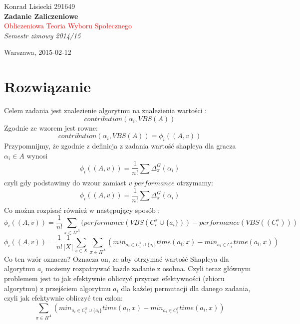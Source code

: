 \documentclass[oneside]{book}
\newcommand*{\titleTH}{\begingroup %
\raggedleft %
\vspace*{\baselineskip} %

{\Large Konrad Lisiecki 291649}\\[0.167\textheight] %

{\LARGE\bfseries Zadanie Zaliczeniowe}\\[\baselineskip] %

{\textcolor{Red}{\Huge Obliczeniowa Teoria Wyboru Społecznego}}\\[\baselineskip] %

{\Large \textit{Semestr zimowy  2014/15  }}\par %

\vfill %

{\large  Warszawa, 2015-02-12}\par %
\renewcommand{\chaptername}{Podpunkt}

\vspace*{3\baselineskip} %
\endgroup}
\begin{document}
 

\pagestyle{empty} %
	

\titleTH %

 


\chapter*{Rozwiązanie}
 
Celem zadania jest znalezienie algorytmu na znalezienia wartości 	:
\begin{equation}
contribution(\alpha_i, VBS(A))
\end{equation}
Zgodnie ze wzorem jest rowne:
\begin{equation}
contribution(\alpha_i, VBS(A)) =  \phi_i((A,v))
\end{equation}
Przypomnijmy, że zgodnie
 z definicja z zadania
 wartość shapleya 
 dla gracza $\alpha_i \in A$ wynosi 
 \begin{equation}
 \phi_i((A,v)) = \frac{1}{n!}\sum_{} \Delta_{\pi}^G (\alpha_i)
 \end{equation} 
 czyli gdy podstawimy do wzour zamiast $v$ $performance$ otrzymamy:
  \begin{equation}
 \phi_i((A,v)) = \frac{1}{n!}\sum_{} \Delta_{\pi}^G (\alpha_i)
 \end{equation} 
Co można rozpisać również w następujący sposób :
  \begin{equation}
 \phi_i((A,v)) = \frac{1}{n!}\sum_{\pi \in \Pi^A} ( performance(VBS(C_i^{\pi} \cup \{a_i\})) -  performance(VBS((C_i^{\pi})) )
 \end{equation}  
   \begin{equation}
 \phi_i((A,v)) =\frac{1}{n!} \frac{1}{ |X|}    \sum _{x \in X} \sum_{\pi \in \Pi^A} (   min_{a_i \in C_i^{\pi}  \cup \{a_i\}} time(a_i, x)  - min_{a_i \in C_i^{\pi}  } time(a_i, x) )
 \end{equation} 
 Co ten wzór oznacza? Oznacza on, ze aby otrzymać wartość Shapleya dla algorytmu $a_i$ możemy rozpatrywać każde zadanie z osobna.
 Czyli teraz głównym problemem jest to jak efektywnie obliczyć przyrost efektywności (zbioru algorytmu) z przejściem algorytmu $a_i$ dla każdej permutacji dla danego zadania, czyli jak efektywnie obliczyć ten człon:
  \begin{equation}
 \sum_{\pi \in \Pi^A} (   min_{a_i \in C_i^{\pi}  \cup \{a_i\}} time(a_i, x)  - min_{a_i \in C_i^{\pi}  } time(a_i, x) )
 \end{equation} 
 
\end{document}
